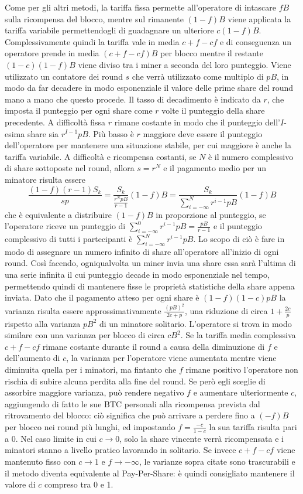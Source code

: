 Come per gli altri metodi, la tariffa fissa permette all'operatore di intascare $fB$ sulla ricompensa del blocco, mentre sul rimanente $(1-f)B$ viene applicata la tariffa variabile permettendogli di guadagnare un ulteriore $c(1-f)B$. Complessivamente quindi la tariffa vale in media $c + f -cf$ e di conseguenza un operatore prende in media $(c+f-cf)B$  per blocco mentre il restante $(1-c)(1-f)B$ viene diviso tra i miner a seconda del loro punteggio.
Viene utilizzato un contatore dei round $s$ che verrà utilizzato come multiplo di $pB$, in modo da far decadere in modo esponenziale il valore delle prime share del round mano a mano che questo procede.
Il tasso di decadimento è indicato da $r$, che imposta il punteggio per ogni share come $r$ volte il punteggio della share precedente. A difficoltà fissa $r$ rimane costante in modo che il punteggio dell'$I$-esima share sia $r^{I-1}pB$. Più basso è $r$ maggiore deve essere il punteggio dell'operatore per mantenere una situazione stabile, per cui maggiore è anche la tariffa variabile.
A difficoltà e ricompensa costanti, se $N$ è il numero complessivo di share sottoposte nel round, allora $s=r^N$ e il pagamento medio per un minatore risulta essere
\[ \frac{(1-f)(r-1)S_k}{sp} = \frac{S_k}{\frac{r^N pB}{r-1}}(1-f)B = \frac{S_k}{\sum^N_{i=-\infty}r^{i-1}pB}(1-f)B \]
che è equivalente a distribuire $(1-f)B$ in proporzione al punteggio, se l'operatore riceve un punteggio di $\sum^0_{i=-\infty}r^{i-1}pB = \frac{pB}{r-1}$ e il punteggio complessivo di tutti i partecipanti è $\sum^N_{i=-\infty}r^{i-1}pB$.
Lo scopo di ciò è fare in modo di assegnare un numero infinito di share all'operatore all'inizio di ogni round. Così facendo, ogniqualvolta un miner invia una share essa sarà l'ultima di una serie infinita il cui punteggio decade in modo esponenziale nel tempo, permettendo quindi di mantenere fisse le proprietà statistiche della share appena inviata.
Dato che il pagamento atteso per ogni share è $(1-f)(1-c)pB$ la varianza risulta essere approssimativamente $\frac{(pB)^2}{2c+p}$, una riduzione di circa $1+\frac{2c}{p}$ rispetto alla varianza $pB^2$ di un minatore solitario. L'operatore si trova in modo similare con una varianza per blocco di circa $cB^2$.
Se la tariffa media complessiva $c+f-cf$ rimane costante durante il round a causa della diminuzione di $f$ e dell'aumento di $c$, la varianza per l'operatore viene aumentata mentre viene diminuita quella per i minatori, ma fintanto che $f$ rimane positivo l'operatore non rischia di subire alcuna perdita alla fine del round. Se però egli sceglie di assorbire maggiore varianza, può rendere negativo $f$ e aumentare ulteriormente $c$, aggiungendo di fatto le sue BTC personali alla ricompensa prevista dal ritrovamento del blocco: ciò significa che può arrivare a perdere fino a $(-f)B$ per blocco nei round più lunghi, ed impostando $f=\frac{-c}{1-c}$ la sua tariffa risulta pari a 0.
Nel caso limite in cui $c \rightarrow 0$, solo la share vincente verrà ricompensata e i minatori stanno a livello pratico lavorando in solitario.
Se invece $c+f-cf$ viene mantenuto fisso con $c \rightarrow 1$ e $f \rightarrow -\infty$, le varianze sopra citate sono trascurabili e il metodo diventa equivalente al Pay-Per-Share: è quindi consigliato mantenere il valore di $c$ compreso tra 0 e 1.

